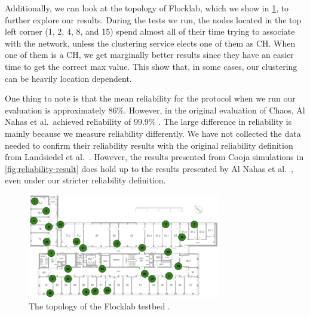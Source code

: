 Additionally, we can look at the topology of Flocklab, which we show in \cref{fig:flocklab-topology}, to further explore our results. During the tests we run, the nodes located in the top left corner (1, 2, 4, 8, and 15) spend almost all of their time trying to associate with the network, unless the clustering service elects one of them as CH. When one of them is a CH, we get marginally better results since they have an easier time to get the correct max value. This show that, in some cases, our clustering can be heavily location dependent.

One thing to note is that the mean reliability for the \atwo{} protocol when we run our evaluation is approximately $86\%$. However, in the original evaluation of Chaos, Al Nahas et al.~achieved reliability of $99.9\%$ \cite{chaos-introduction-paper}. The large difference in reliability is mainly because we measure reliability differently. We have not collected the data needed to confirm their reliability results with the original reliability definition from Landsiedel et al.~\cite{chaos-introduction-paper}. However, the results presented from Cooja simulations in \cref{fig:reliability-result} does hold up to the results presented by Al Nahas et al.~\cite{a2-introduction-paper}, even under our stricter reliability definition.

\begin{figure}[bt]
    \centering
    \includegraphics[width=0.75\textwidth]{figure/Results/ChaosComparison/Flocklab/FlocklabTopology.png}
    \caption{The topology of the Flocklab testbed \cite{Lim2013-flocklab-introduction}.}
    \label{fig:flocklab-topology}
\end{figure}


